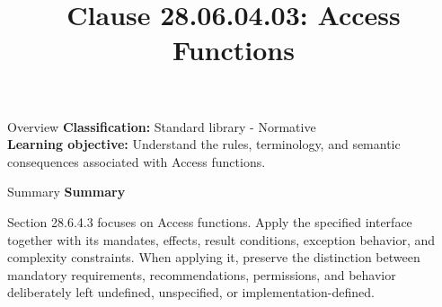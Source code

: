 \documentclass[10pt,letterpaper]{article}
\title{Clause 28.06.04.03: Access Functions}
\author{}
\date{}
\begin{document}
\maketitle
\begin{CornellOverviewBox}{Overview}
\textbf{Classification:} Standard library - Normative\\[2pt]
\textbf{Learning objective:} Understand the rules, terminology, and semantic consequences associated with Access functions.
\end{CornellOverviewBox}\begin{CornellSummaryBox}{Summary}
{\sffamily\bfseries\color{Accent} Summary}\par\vspace{3pt}Section 28.6.4.3 focuses on Access functions. Apply the specified interface together with its mandates, effects, result conditions, exception behavior, and complexity constraints. When applying it, preserve the distinction between mandatory requirements, recommendations, permissions, and behavior deliberately left undefined, unspecified, or implementation-defined.
\end{CornellSummaryBox}
\end{document}
